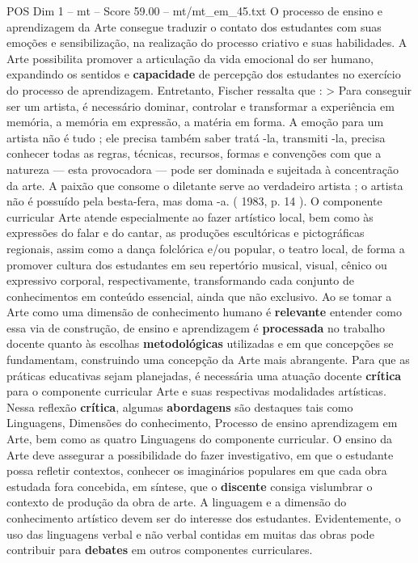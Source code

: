 \begin{textsample}{POS Dim 1 – mt – Score 59.00 – mt/mt\_em\_45.txt}
O processo de ensino e aprendizagem da Arte consegue traduzir o contato dos estudantes com suas emoções e sensibilização, na realização do processo criativo e suas habilidades.
A Arte possibilita promover a articulação da vida emocional do ser humano, expandindo os sentidos e \textbf{capacidade} de percepção dos estudantes no exercício do processo de aprendizagem.
Entretanto, Fischer ressalta que : > Para conseguir ser um artista, é necessário dominar, controlar e transformar a experiência em memória, a memória em expressão, a matéria em forma.
A emoção para um artista não é tudo ; ele precisa também saber tratá -la, transmiti -la, precisa conhecer todas as regras, técnicas, recursos, formas e convenções com que a natureza — esta provocadora — pode ser dominada e sujeitada à concentração da arte.
A paixão que consome o diletante serve ao verdadeiro artista ; o artista não é possuído pela besta-fera, mas doma -a. ( 1983, p. 14 ).
O componente curricular Arte atende especialmente ao fazer artístico local, bem como às expressões do falar e do cantar, as produções escultóricas e pictográficas regionais, assim como a dança folclórica e/ou popular, o teatro local, de forma a promover cultura dos estudantes em seu repertório musical, visual, cênico ou expressivo corporal, respectivamente, transformando cada conjunto de conhecimentos em conteúdo essencial, ainda que não exclusivo.
Ao se tomar a Arte como uma dimensão de conhecimento humano é \textbf{relevante} entender como essa via de construção, de ensino e aprendizagem é \textbf{processada} no trabalho docente quanto às escolhas \textbf{metodológicas} utilizadas e em que concepções se fundamentam, construindo uma concepção da Arte mais abrangente.
Para que as práticas educativas sejam planejadas, é necessária uma atuação docente \textbf{crítica} para o componente curricular Arte e suas respectivas modalidades artísticas.
Nessa reflexão \textbf{crítica}, algumas \textbf{abordagens} são destaques tais como Linguagens, Dimensões do conhecimento, Processo de ensino aprendizagem em Arte, bem como as quatro Linguagens do componente curricular.
O ensino da Arte deve assegurar a possibilidade do fazer investigativo, em que o estudante possa refletir contextos, conhecer os imaginários populares em que cada obra estudada fora concebida, em síntese, que o \textbf{discente} consiga vislumbrar o contexto de produção da obra de arte.
A linguagem e a dimensão do conhecimento artístico devem ser do interesse dos estudantes.
Evidentemente, o uso das linguagens verbal e não verbal contidas em muitas das obras pode contribuir para \textbf{debates} em outros componentes curriculares.

\end{textsample}
